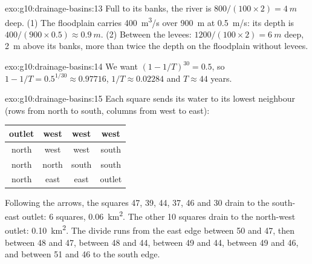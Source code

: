 \begin{solution}{exo:g10:drainage-basins:13}
Full to its banks, the river is $800/(100 \times 2) = \qty{4}{m}$ deep.
(1) The floodplain carries \qty{400}{m^3/s} over \qty{900}{m} at
\qty{0.5}{m/s}: its depth is $400/(900 \times 0.5) \approx \qty{0.9}{m}$.
(2) Between the levees: $1200/(100 \times 2) = \qty{6}{m}$ deep, \qty{2}{m}
above its banks, more than twice the depth on the floodplain without
levees.
\end{solution}

\begin{solution}{exo:g10:drainage-basins:14}
We want $(1 - 1/T)^{30} = 0.5$, so $1 - 1/T = 0.5^{1/30} \approx 0.97716$,
$1/T \approx 0.02284$ and $T \approx 44$ years.
\end{solution}

\begin{solution}{exo:g10:drainage-basins:15}
Each square sends its water to its lowest neighbour (rows from north to south,
columns from west to east):
\begin{center}
\begin{tabular}{|c|c|c|c|}
\hline
outlet & west & west & west \\ \hline
north & west & west & south \\ \hline
north & north & south & south \\ \hline
north & east & east & outlet \\ \hline
\end{tabular}
\end{center}
Following the arrows, the squares 47, 39, 44, 37, 46 and 30 drain to the
south-east outlet: 6 squares, \qty{0.06}{km^2}. The other 10 squares drain
to the north-west outlet: \qty{0.10}{km^2}. The divide runs from the east
edge between 50 and 47, then between 48 and 47, between 48 and 44, between
49 and 44, between 49 and 46, and between 51 and 46 to the south edge.
\end{solution}

